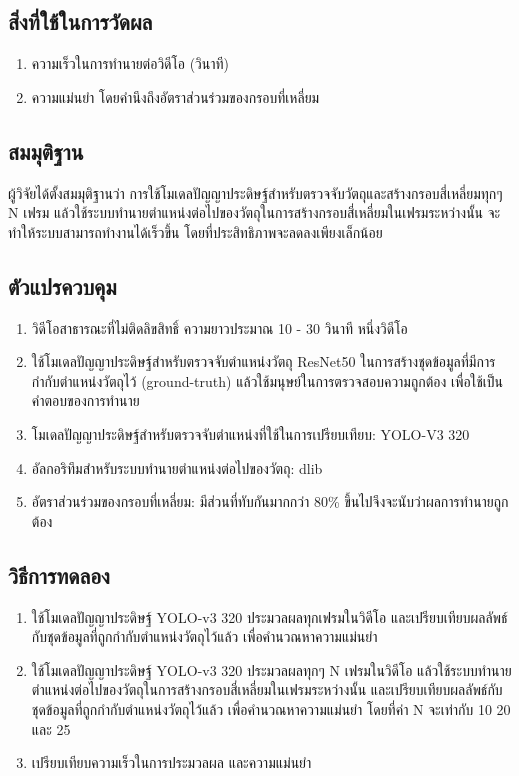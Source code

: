 \subsection*{สิ่งที่ใช้ในการวัดผล}
	\begin{enumerate}
		\item ความเร็วในการทำนายต่อวิดีโอ (วินาที)
		\item ความแม่นยำ โดยคำนึงถึงอัตราส่วนร่วมของกรอบที่เหลี่ยม
	\end{enumerate}
\subsection*{สมมุติฐาน}
ผู้วิจัยได้ตั้งสมมุติฐานว่า การใช้โมเดลปัญญาประดิษฐ์สำหรับตรวจจับวัตถุและสร้างกรอบสี่เหลี่ยมทุกๆ N เฟรม 
แล้วใช้ระบบทำนายตำแหน่งต่อไปของวัตถุในการสร้างกรอบสี่เหลี่ยมในเฟรมระหว่างนั้น จะทำให้ระบบสามารถทำงานได้เร็วขึ้น โดยที่ประสิทธิภาพจะลดลงเพียงเล็กน้อย
\subsection*{ตัวแปรควบคุม}
	\begin{enumerate}
		\item วิดีโอสาธารณะที่ไม่ติดลิขสิทธิ์ ความยาวประมาณ 10 - 30 วินาที หนึ่งวิดีโอ
		\item ใช้โมเดลปัญญาประดิษฐ์สำหรับตรวจจับตำแหน่งวัตถุ ResNet50 ในการสร้างชุดข้อมูลที่มีการกำกับตำแหน่งวัตถุไว้ (ground-truth) แล้วใช้มนุษย์ในการตรวจสอบความถูกต้อง
		เพื่อใช้เป็นคำตอบของการทำนาย
		\item โมเดลปัญญาประดิษฐ์สำหรับตรวจจับตำแหน่งที่ใช้ในการเปรียบเทียบ: YOLO-V3 320
		\item อัลกอริทึมสำหรับระบบทำนายตำแหน่งต่อไปของวัตถุ: dlib
		\item อัตราส่วนร่วมของกรอบที่เหลี่ยม: มีส่วนที่ทับกันมากกว่า 80\% ขึ้นไปจึงจะนับว่าผลการทำนายถูกต้อง
	\end{enumerate}
\subsection*{วิธีการทดลอง}
	\begin{enumerate}
		\item ใช้โมเดลปัญญาประดิษฐ์ YOLO-v3 320 ประมวลผลทุกเฟรมในวิดีโอ และเปรียบเทียบผลลัพธ์กับชุดข้อมูลที่ถูกกำกับตำแหน่งวัตถุไว้แล้ว เพื่อคำนวณหาความแม่นยำ
		\item ใช้โมเดลปัญญาประดิษฐ์ YOLO-v3 320 ประมวลผลทุกๆ N เฟรมในวิดีโอ แล้วใช้ระบบทำนายตำแหน่งต่อไปของวัตถุในการสร้างกรอบสี่เหลี่ยมในเฟรมระหว่างนั้น 
		และเปรียบเทียบผลลัพธ์กับชุดข้อมูลที่ถูกกำกับตำแหน่งวัตถุไว้แล้ว เพื่อคำนวณหาความแม่นยำ โดยที่ค่า N จะเท่ากับ 10 20 และ 25
		\item เปรียบเทียบความเร็วในการประมวลผล และความแม่นยำ
\end{enumerate}